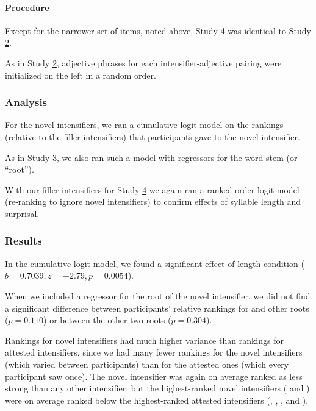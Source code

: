 \paragraph{Procedure%
}

Except for the narrower set of items, noted above, Study \hyperref[sec:study4]{4} was identical to Study \hyperref[sec:study2]{2}. 

As in Study \hyperref[sec:study2]{2}, adjective phrases for each intensifier-adjective pairing were initialized on the left in a random order.

\subsubsection{Analysis}

For the novel intensifiers, we ran a cumulative logit model on the rankings (relative to the filler intensifiers) that participants gave to the novel intensifier.

As in Study \hyperref[sec:study3]{3}, we also ran such a model with regressors for the word stem (or ``root'').

With our filler intensifiers for Study \hyperref[sec:study4]{4} we again ran a ranked order logit model (re-ranking to ignore novel intensifiers) to confirm effects of syllable length and surprisal.

\subsubsection{Results}

In the cumulative logit model, we found a significant effect of length condition ($b=0.7039, z=-2.79, p=0.0054$).

When we included a regressor for the root of the novel intensifier, we did not find a significant difference between participants' relative rankings for  and other roots ($p=0.110$) or between the other two roots ($p=0.304$).

Rankings for novel intensifiers had much higher variance than rankings for attested intensifiers, since we had many fewer rankings for the novel intensifiers (which varied between participants) than for the attested ones (which every participant saw once). The novel intensifier  was again on average ranked as less strong than any other intensifier, but the highest-ranked novel intensifiers ( and ) were on average ranked below the highest-ranked attested intensifiers (, , , and ).

